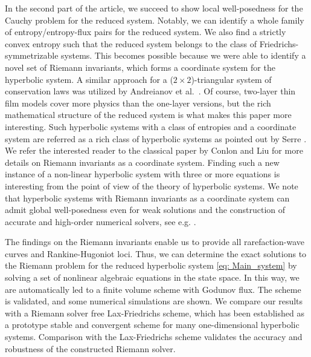 \documentclass[11pt]{article}
\numberwithin{equation}{section}
\newtheorem{counter example}[theorem]{Counter Example}
\begin{document}
{In the second part of the article, we succeed to show local well-posedness for the Cauchy problem for the reduced system. Notably, we can identify a whole family of entropy/entropy-flux pairs for the reduced system. We also find a strictly convex entropy such that the reduced system belongs to the class of Friedrichs-symmetrizable systems. This becomes possible because we were able to identify a novel set of Riemann invariants, which forms a coordinate system for the hyperbolic system. A similar approach for a ($2\times 2$)-triangular system of conservation laws was utilized by Andreianov et al.~\cite{andreianov2015attainable}. Of course, two-layer thin film models cover more physics than the one-layer versions, but the rich mathematical structure of the reduced system is what makes this paper more interesting. Such hyperbolic systems with a class of entropies and a coordinate system are referred as a rich class of hyperbolic systems as pointed out by Serre \cite{MR1087091}. We refer the interested reader to the classical paper by Conlon and Liu \cite{conlon1981admissibility} for more details on Riemann invariants as a coordinate system. Finding such a new instance of a non-linear hyperbolic system with three or more equations is interesting from the point of view of the theory of hyperbolic systems. We note that hyperbolic systems with Riemann invariants as a coordinate system can admit global well-posedness even for weak solutions and the construction of accurate and high-order numerical solvers, see e.g. \cite{barthwal2025generalized, serre1999systems, MR4732267}. 

The findings on the Riemann invariants enable us to provide all rarefaction-wave curves and Rankine-Hugoniot loci. Thus, we can determine the exact solutions to the Riemann problem for the reduced hyperbolic system \eqref{eq: Main_system} by solving a set of nonlinear algebraic equations in the state space. In this way, we are automatically led to a finite volume scheme with Godunov flux. The scheme is validated, and some numerical simulations are shown. We compare our results with a Riemann solver free Lax-Friedrichs scheme, which has been established as a prototype stable and convergent scheme for many one-dimensional hyperbolic systems. Comparison with the Lax-Friedrichs scheme validates the accuracy and robustness of the constructed Riemann solver. 

}
\end{document}
